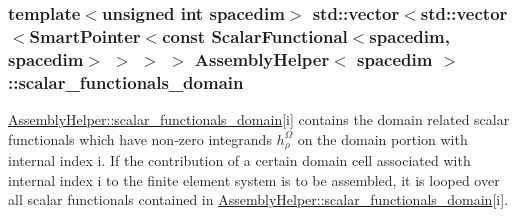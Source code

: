 \subsubsection[{\texorpdfstring{scalar\+\_\+functionals\+\_\+domain}{scalar_functionals_domain}}]{\setlength{\rightskip}{0pt plus 5cm}template$<$unsigned int spacedim$>$ std\+::vector$<$std\+::vector$<${\bf Smart\+Pointer}$<$const {\bf Scalar\+Functional}$<$spacedim, spacedim$>$ $>$ $>$ $>$ {\bf Assembly\+Helper}$<$ spacedim $>$\+::scalar\+\_\+functionals\+\_\+domain\hspace{0.3cm}{\ttfamily [private]}}\hypertarget{class_assembly_helper_aa6fa619e4c2582e95950e878cd06628e}{}\label{class_assembly_helper_aa6fa619e4c2582e95950e878cd06628e}
\hyperlink{class_assembly_helper_aa6fa619e4c2582e95950e878cd06628e}{Assembly\+Helper\+::scalar\+\_\+functionals\+\_\+domain}\mbox{[}{\ttfamily i}\mbox{]} contains the domain related scalar functionals which have non-\/zero integrands $h^\Omega_\rho$ on the domain portion with internal index {\ttfamily i}. If the contribution of a certain domain cell associated with internal index {\ttfamily i} to the finite element system is to be assembled, it is looped over all scalar functionals contained in \hyperlink{class_assembly_helper_aa6fa619e4c2582e95950e878cd06628e}{Assembly\+Helper\+::scalar\+\_\+functionals\+\_\+domain}\mbox{[}{\ttfamily i}\mbox{]}. 
